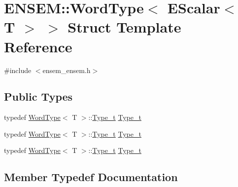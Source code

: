 \hypertarget{structENSEM_1_1WordType_3_01EScalar_3_01T_01_4_01_4}{}\section{E\+N\+S\+EM\+:\+:Word\+Type$<$ E\+Scalar$<$ T $>$ $>$ Struct Template Reference}
\label{structENSEM_1_1WordType_3_01EScalar_3_01T_01_4_01_4}


{\ttfamily \#include $<$ensem\+\_\+ensem.\+h$>$}

\subsection*{Public Types}
\begin{DoxyCompactItemize}
\item 
typedef \mbox{\hyperlink{structENSEM_1_1WordType}{Word\+Type}}$<$ T $>$\+::\mbox{\hyperlink{structENSEM_1_1WordType_3_01EScalar_3_01T_01_4_01_4_adc30dc1892bde666c3cbe7a8ea951497}{Type\+\_\+t}} \mbox{\hyperlink{structENSEM_1_1WordType_3_01EScalar_3_01T_01_4_01_4_adc30dc1892bde666c3cbe7a8ea951497}{Type\+\_\+t}}
\item 
typedef \mbox{\hyperlink{structENSEM_1_1WordType}{Word\+Type}}$<$ T $>$\+::\mbox{\hyperlink{structENSEM_1_1WordType_3_01EScalar_3_01T_01_4_01_4_adc30dc1892bde666c3cbe7a8ea951497}{Type\+\_\+t}} \mbox{\hyperlink{structENSEM_1_1WordType_3_01EScalar_3_01T_01_4_01_4_adc30dc1892bde666c3cbe7a8ea951497}{Type\+\_\+t}}
\item 
typedef \mbox{\hyperlink{structENSEM_1_1WordType}{Word\+Type}}$<$ T $>$\+::\mbox{\hyperlink{structENSEM_1_1WordType_3_01EScalar_3_01T_01_4_01_4_adc30dc1892bde666c3cbe7a8ea951497}{Type\+\_\+t}} \mbox{\hyperlink{structENSEM_1_1WordType_3_01EScalar_3_01T_01_4_01_4_adc30dc1892bde666c3cbe7a8ea951497}{Type\+\_\+t}}
\end{DoxyCompactItemize}


\subsection{Member Typedef Documentation}
\mbox{\label{structENSEM_1_1WordType_3_01EScalar_3_01T_01_4_01_4_adc30dc1892bde666c3cbe7a8ea951497}} 

